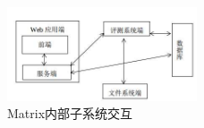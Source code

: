 \begin{figure}[h]
  \centering
  \includegraphics[width=0.5\textwidth]{image/chapter3/1}
  \caption{Matrix内部子系统交互}
  \label{fig:system_iteract}
\end{figure}

